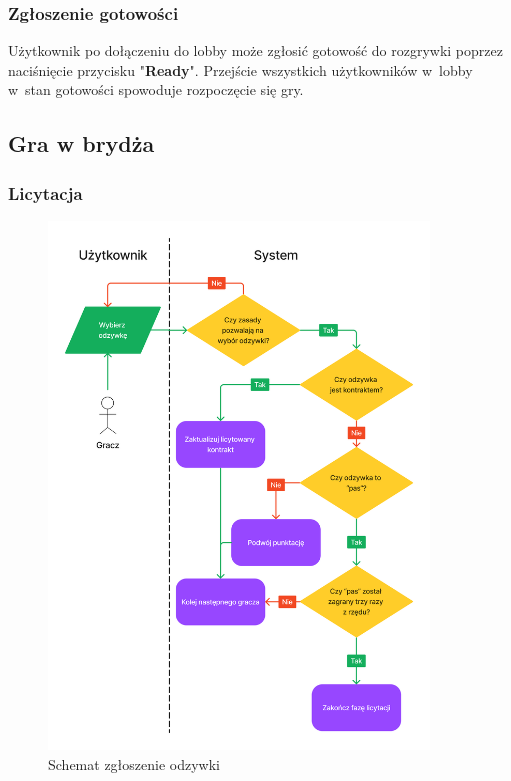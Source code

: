 \FloatBarrier


\subsubsection{Zgłoszenie gotowości}
Użytkownik po dołączeniu do lobby może zgłosić gotowość do rozgrywki poprzez
naciśnięcie przycisku "\textbf{Ready}". Przejście wszystkich użytkowników w~lobby
w~stan gotowości spowoduje rozpoczęcie się gry.


\subsection{Gra w brydża}

\subsubsection{Licytacja}

\begin{figure}[hbt!]
    \centering
    \includegraphics[width=0.9\textwidth]{img/schematy/bid.png}
    \caption{Schemat zgłoszenie odzywki}
    \label{fig:figma_xd_bid}
\end{figure}

